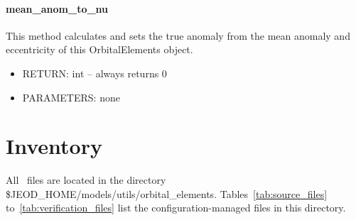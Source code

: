    \paragraph{mean\_anom\_to\_nu}

This method calculates and sets the true anomaly from the mean anomaly
and eccentricity of this OrbitalElements object.

\begin{itemize}
\item{RETURN:}   int -- always returns $0$
\item{PARAMETERS:}   none
\end{itemize}
\section{Inventory}

All \OrbitalElementDesc\ files are located in the directory
\$JEOD\_HOME/models/utils/orbital\_elements.
Tables~\ref{tab:source_files} to~\ref{tab:verification_files}
list the configuration-managed files in this directory.



